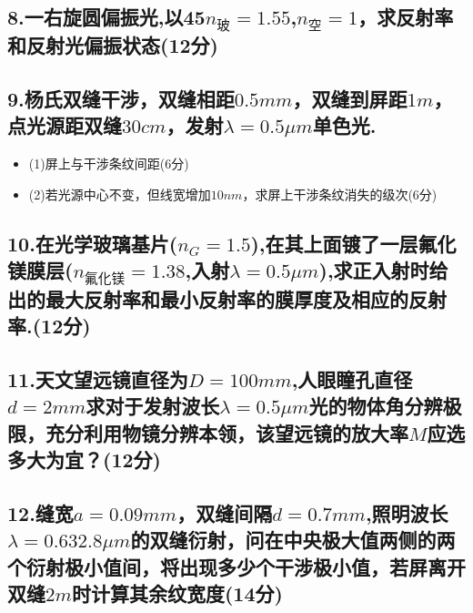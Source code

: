 \documentclass[11pt,a4paper]{article}
\begin{document}
    \subsection*{8.一右旋圆偏振光,以45$n_\text{玻}=1.55$,$n_\text{空}=1$，求反射率和反射光偏振状态(12分)}
    \vspace{15mm}
    \subsection*{9.杨氏双缝干涉，双缝相距$0.5mm$，双缝到屏距$1m$，点光源距双缝$30cm$，发射$\lambda =0.5\mu m$单色光.}
    \begin{itemize}
        \vspace{-3mm}
        \item (1)屏上与干涉条纹间距(6分)
        \vspace{-3mm}
        \item (2)若光源中心不变，但线宽增加$10nm$，求屏上干涉条纹消失的级次(6分)
    \end{itemize}
    \vspace{15mm}
    \subsection*{10.在光学玻璃基片($n_G=1.5$),在其上面镀了一层氟化镁膜层($n_\text{氟化镁}=1.38$,入射$\lambda =0.5\mu m$),求正入射时给出的最大反射率和最小反射率的膜厚度及相应的反射率.(12分)}
    \vspace{15mm}
    \subsection*{11.天文望远镜直径为$D=100mm$,人眼瞳孔直径$d=2mm$求对于发射波长$\lambda =0.5\mu m$光的物体角分辨极限，充分利用物镜分辨本领，该望远镜的放大率$M$应选多大为宜？(12分)}
    \vspace{15mm}
    \subsection*{12.缝宽$a=0.09mm$，双缝间隔$d=0.7mm$,照明波长$\lambda =0.632.8\mu m$的双缝衍射，问在中央极大值两侧的两个衍射极小值间，将出现多少个干涉极小值，若屏离开双缝$2m$时计算其余纹宽度(14分)}
    \vspace{15mm}
\end{document}
